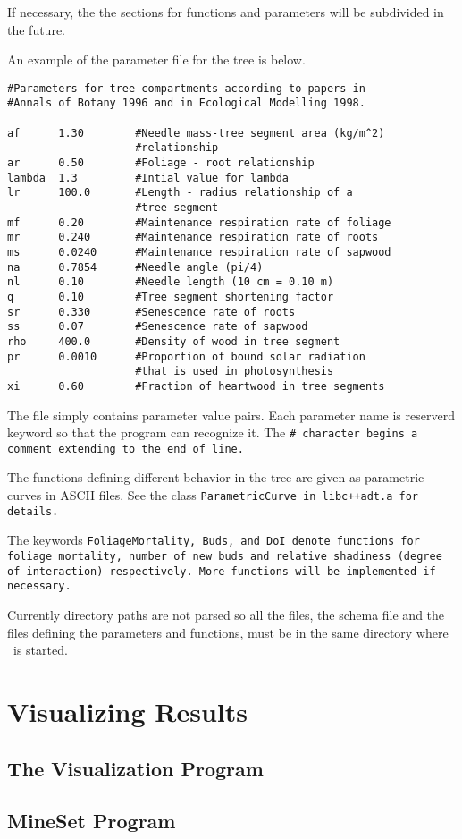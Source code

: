 If necessary, the the sections for functions and parameters
will be subdivided in the future. 

An example of the parameter file for the tree is below.

\begin{verbatim}
#Parameters for tree compartments according to papers in
#Annals of Botany 1996 and in Ecological Modelling 1998.

af      1.30        #Needle mass-tree segment area (kg/m^2)
                    #relationship
ar      0.50        #Foliage - root relationship 
lambda  1.3         #Intial value for lambda
lr      100.0       #Length - radius relationship of a 
                    #tree segment
mf      0.20        #Maintenance respiration rate of foliage
mr      0.240       #Maintenance respiration rate of roots
ms      0.0240      #Maintenance respiration rate of sapwood
na      0.7854      #Needle angle (pi/4)
nl      0.10        #Needle length (10 cm = 0.10 m) 
q       0.10        #Tree segment shortening factor
sr      0.330       #Senescence rate of roots
ss      0.07        #Senescence rate of sapwood
rho     400.0       #Density of wood in tree segment
pr      0.0010      #Proportion of bound solar radiation
                    #that is used in photosynthesis
xi      0.60        #Fraction of heartwood in tree segments
\end{verbatim}

The file simply contains parameter value pairs. Each parameter
name is reserverd keyword so that the program can recognize it.
The \tt \# \rm character begins a comment extending to the end of line.

The functions defining different behavior in the tree are given
as parametric curves in ASCII files. See the class 
\tt ParametricCurve \rm in \tt libc++adt.a \rm for details.

The keywords \tt FoliageMortality\rm, \tt Buds\rm, and
\tt DoI \rm denote functions for foliage mortality, number of new buds 
and relative shadiness (degree of interaction) respectively. More functions
will be implemented if necessary.

Currently directory paths are not parsed so all the files,
the schema file and the files defining the parameters and functions,
must be in the same directory where \lignum\ is started.


\section{Visualizing Results}

\subsection{The Visualization Program}
\subsection{MineSet Program}








